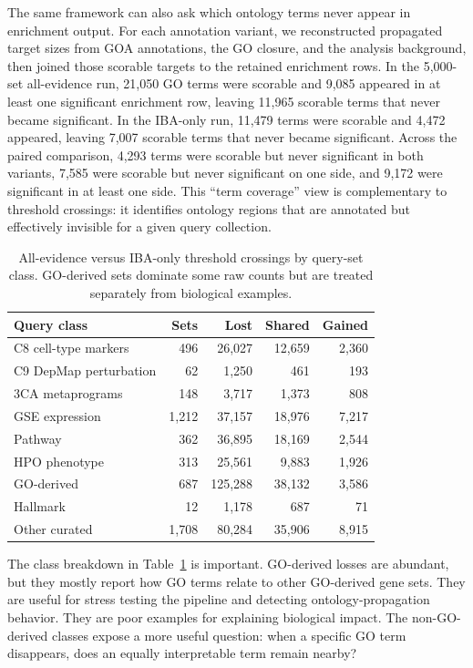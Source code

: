 \documentclass[11pt]{article}
\begin{document}
The same framework can also ask which ontology terms never appear in enrichment output. For each annotation variant, we reconstructed propagated target sizes from GOA annotations, the GO closure, and the analysis background, then joined those scorable targets to the retained enrichment rows. In the 5,000-set all-evidence run, 21,050 GO terms were scorable and 9,085 appeared in at least one significant enrichment row, leaving 11,965 scorable terms that never became significant. In the IBA-only run, 11,479 terms were scorable and 4,472 appeared, leaving 7,007 scorable terms that never became significant. Across the paired comparison, 4,293 terms were scorable but never significant in both variants, 7,585 were scorable but never significant on one side, and 9,172 were significant in at least one side. This ``term coverage'' view is complementary to threshold crossings: it identifies ontology regions that are annotated but effectively invisible for a given query collection.

\begin{table}[t]
\centering
\caption{All-evidence versus IBA-only threshold crossings by query-set class. GO-derived sets dominate some raw counts but are treated separately from biological examples.}
\label{tab:diff-by-class}
\footnotesize
\begin{tabular}{lrrrr}
\toprule
Query class & Sets & Lost & Shared & Gained \\
\midrule
C8 cell-type markers & 496 & 26,027 & 12,659 & 2,360 \\
C9 DepMap perturbation & 62 & 1,250 & 461 & 193 \\
3CA metaprograms & 148 & 3,717 & 1,373 & 808 \\
GSE expression & 1,212 & 37,157 & 18,976 & 7,217 \\
Pathway & 362 & 36,895 & 18,169 & 2,544 \\
HPO phenotype & 313 & 25,561 & 9,883 & 1,926 \\
GO-derived & 687 & 125,288 & 38,132 & 3,586 \\
Hallmark & 12 & 1,178 & 687 & 71 \\
Other curated & 1,708 & 80,284 & 35,906 & 8,915 \\
\bottomrule
\end{tabular}
\end{table}

The class breakdown in Table~\ref{tab:diff-by-class} is important. GO-derived losses are abundant, but they mostly report how GO terms relate to other GO-derived gene sets. They are useful for stress testing the pipeline and detecting ontology-propagation behavior. They are poor examples for explaining biological impact. The non-GO-derived classes expose a more useful question: when a specific GO term disappears, does an equally interpretable term remain nearby?
\end{document}
